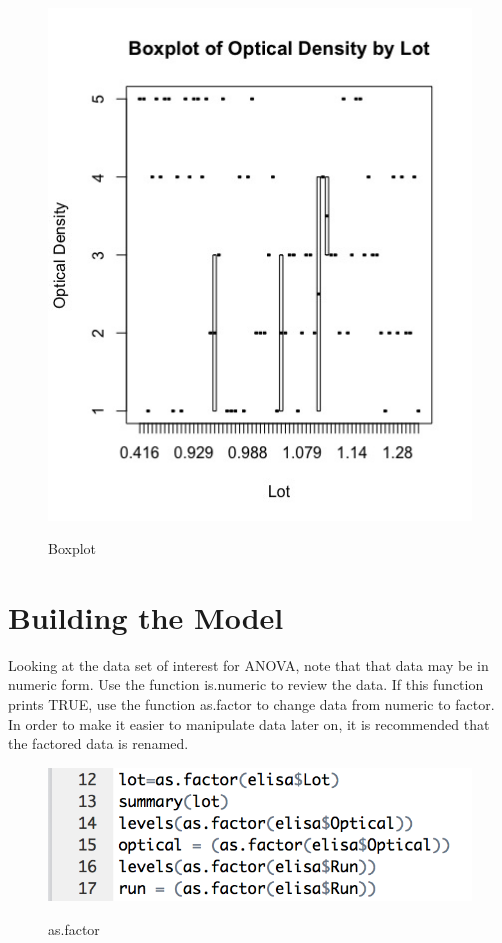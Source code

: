 \begin{figure}[H] %
        \centering
        \caption{Boxplot}
        \includegraphics[scale=0.5]{pictures/BoxPlotOpticalDensity.jpg} 
        \label{fig:BoxPlotOpticalDensity}
\end{figure}

 

\section{Building the Model}

Looking at the data set of interest for ANOVA, note that that data may be in numeric form. Use the function is.numeric to review the data. If this function prints TRUE, use the function as.factor to change data from numeric to factor. In order to make it easier to manipulate data later on, it is recommended that the factored data is renamed. 
\begin{figure}[H] %
        \centering
        \caption{as.factor}
        \includegraphics[scale=0.5]{pictures/asFactor} 
        \label{fig:as.factor}
\end{figure}

